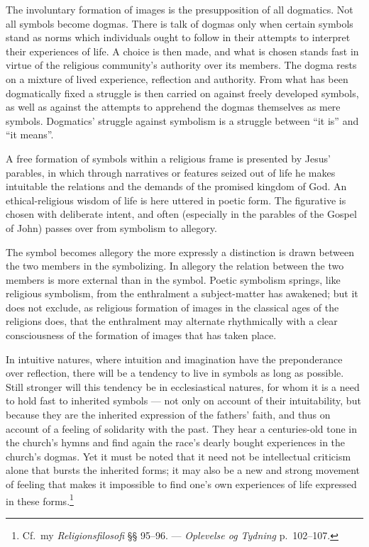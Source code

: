 \documentclass[12pt]{book}
\newcommand{\opage}[1]{\marginnote{\footnotesize\textit{[#1]}}}
\begin{document}
\opage{36}The involuntary formation of images is the presupposition of all dogmatics. Not
all symbols become dogmas. There is talk of dogmas only when certain symbols
stand as norms which individuals ought to follow in their attempts to interpret
their experiences of life. A choice is then made, and what is chosen stands fast
in virtue of the religious community's authority over its members. The dogma
rests on a mixture of lived experience, reflection and authority. From what has
been dogmatically fixed a struggle is then carried on against freely developed
symbols, as well as against the attempts to apprehend the dogmas themselves as
mere symbols. Dogmatics' struggle against symbolism is a struggle between ``it
is'' and ``it means''.

A free formation of symbols within a religious frame is presented by Jesus'
parables, in which through narratives or features seized out of life he makes
intuitable the relations and the demands of the promised kingdom of God. An
ethical-religious wisdom of life is here uttered in poetic form. The figurative
is chosen with deliberate intent, and often (especially in the parables of the
Gospel of John) passes over from symbolism to allegory.

The symbol becomes allegory the more expressly a distinction is drawn between
the two members in the symbolizing. In allegory the relation between the two
members is more external than in the symbol. Poetic symbolism springs, like
religious symbolism, from the enthralment a subject-matter has awakened; but it
does not exclude, as religious formation of images in the classical ages of the
religions does, that the enthralment may alternate rhythmically with a clear
consciousness of the formation of images that has taken place.

In intuitive natures, where intuition and imagination have the preponderance
over reflection, there will be a tendency to live in symbols as long as
possible. Still stronger \opage{37}will this tendency be in ecclesiastical natures, for
whom it is a need to hold fast to inherited symbols --- not only on account of
their intuitability, but because they are the inherited expression of the
fathers' faith, and thus on account of a feeling of solidarity with the past.
They hear a centuries-old tone in the church's hymns and find again the race's
dearly bought experiences in the church's dogmas. Yet it must be noted that it
need not be intellectual criticism alone that bursts the inherited forms; it may
also be a new and strong movement of feeling that makes it impossible to find
one's own experiences of life expressed in these forms.\footnote{Cf.\ my
\textit{Religionsfilosofi} §§ 95--96. --- \textit{Oplevelse og Tydning} p.\
102--107.}
\end{document}
